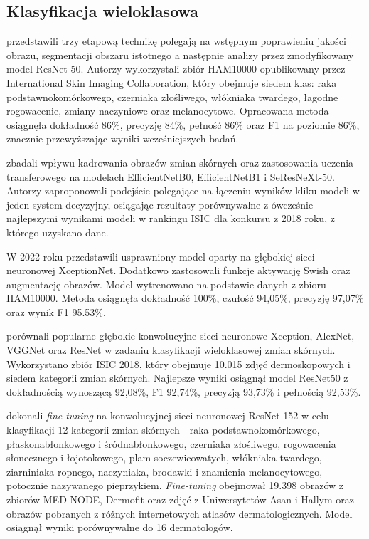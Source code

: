 \subsection{Klasyfikacja wieloklasowa}
\citet{Alwakid_Gouda_Humayun_Sama_2022} przedstawili trzy etapową technikę polegają na wstępnym poprawieniu jakości obrazu, segmentacji obszaru istotnego a następnie analizy przez zmodyfikowany model ResNet-50.
Autorzy wykorzystali zbiór HAM10000 opublikowany przez International Skin Imaging Collaboration, który obejmuje siedem klas: raka podstawnokomórkowego, czerniaka złośliwego, włókniaka twardego, łagodne rogowacenie, zmiany naczyniowe oraz melanocytowe.
Opracowana metoda osiągnęła dokładność 86\%, precyzję 84\%, pełność 86\% oraz F1 na poziomie 86\%, znacznie przewyższając wyniki wcześniejszych badań.

\citet{Mahbod_Schaefer_Wang_Dorffner_Ecker_Ellinger_2020} zbadali wpływu kadrowania obrazów zmian skórnych oraz zastosowania uczenia transferowego na modelach EfficientNetB0, EfficientNetB1 i SeResNeXt-50.
Autorzy zaproponowali podejście polegające na łączeniu wyników kliku modeli w jeden system decyzyjny, osiągając rezultaty porównywalne z ówcześnie najlepszymi wynikami modeli w rankingu ISIC dla konkursu z 2018 roku, z którego uzyskano dane.

W 2022 roku \citet{Lu_Firoozeh_Abolhasani_Zadeh_2022} przedstawili usprawniony model oparty na głębokiej sieci neuronowej XceptionNet.
Dodatkowo zastosowali funkcje aktywację Swish oraz augmentację obrazów.
Model wytrenowano na podstawie danych z zbioru HAM10000.
Metoda osiągnęła dokładność 100\%, czułość 94,05\%, precyzję 97,07\% oraz wynik F1 95.53\%.

\citet{Kassani_2019} porównali popularne głębokie konwolucyjne sieci neuronowe Xception, AlexNet, VGGNet oraz ResNet w zadaniu klasyfikacji wieloklasowej zmian skórnych.
Wykorzystano zbiór ISIC 2018, który obejmuje 10.015 zdjęć dermoskopowych i siedem kategorii zmian skórnych.
Najlepsze wyniki osiągnął model ResNet50 z dokładnością wynoszącą 92,08\%, F1 92,74\%, precyzją 93,73\% i pełnością 92,53\%.

\citet{Han_Kim_Lim_Park_Park_Chang_2018} dokonali \textit{fine-tuning} na konwolucyjnej sieci neuronowej ResNet-152 w celu klasyfikacji 12 kategorii zmian skórnych - raka podstawnokomórkowego, płaskonabłonkowego i śródnabłonkowego, czerniaka złośliwego, rogowacenia słonecznego i łojotokowego, plam soczewicowatych, włókniaka twardego, ziarniniaka ropnego, naczyniaka, brodawki i znamienia melanocytowego, potocznie nazywanego pieprzykiem. 
\textit{Fine-tuning} obejmował 19.398 obrazów z zbiorów MED-NODE, Dermofit oraz zdjęć z Uniwersytetów Asan i Hallym oraz obrazów pobranych z różnych internetowych atlasów dermatologicznych.
Model osiągnął wyniki porównywalne do 16 dermatologów.
 
